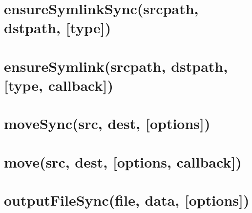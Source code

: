 \documentclass[twoside]{book}
\newcommand{\+}{\discretionary{\mbox{\scriptsize$\hookleftarrow$}}{}{}}
\begin{document}
\chapter{ensure\+Symlink\+Sync(srcpath, dstpath, \mbox{[}type\mbox{]})}
\label{md_dsmacc_examples_DRmerge_node_modules_electron-packager_node_modules_fs-extra_docs_ensureSymlink-sync}

\chapter{ensure\+Symlink(srcpath, dstpath, \mbox{[}type, callback\mbox{]})}
\label{md_dsmacc_examples_DRmerge_node_modules_electron-packager_node_modules_fs-extra_docs_ensureSymlink}

\chapter{move\+Sync(src, dest, \mbox{[}options\mbox{]})}
\label{md_dsmacc_examples_DRmerge_node_modules_electron-packager_node_modules_fs-extra_docs_move-sync}

\chapter{move(src, dest, \mbox{[}options, callback\mbox{]})}
\label{md_dsmacc_examples_DRmerge_node_modules_electron-packager_node_modules_fs-extra_docs_move}

\chapter{output\+File\+Sync(file, data, \mbox{[}options\mbox{]})}
\label{md_dsmacc_examples_DRmerge_node_modules_electron-packager_node_modules_fs-extra_docs_outputFile-sync}

\end{document}
